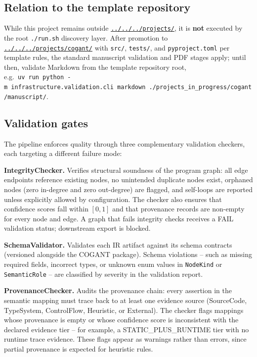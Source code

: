 \documentclass[
]{article}
\begin{document}
\subsection{Relation to the template
repository}\label{relation-to-the-template-repository}

While this project remains outside
\href{../../../projects/}{\texttt{../../../projects/}}, it is
\textbf{not} executed by the root \texttt{./run.sh} discovery layer.
After promotion to
\href{../../../projects/cogant/}{\texttt{../../../projects/cogant/}}
with \texttt{src/}, \texttt{tests/}, and \texttt{pyproject.toml} per
template rules, the standard manuscript validation and PDF stages apply;
until then, validate Markdown from the template repository root,
e.g.~\texttt{uv\ run\ python\ -m\ infrastructure.validation.cli\ markdown\ ./projects\_in\_progress/cogant/manuscript/}.

\subsection{Validation gates}\label{validation-gates}

The pipeline enforces quality through three complementary validation
checkers, each targeting a different failure mode:

\textbf{IntegrityChecker.} Verifies structural soundness of the program
graph: all edge endpoints reference existing nodes, no unintended
duplicate nodes exist, orphaned nodes (zero in-degree and zero
out-degree) are flagged, and self-loops are reported unless explicitly
allowed by configuration. The checker also ensures that confidence
scores fall within \([0, 1]\) and that provenance records are non-empty
for every node and edge. A graph that fails integrity checks receives a
FAIL validation status; downstream export is blocked.

\textbf{SchemaValidator.} Validates each IR artifact against its schema
contracts (versioned alongside the COGANT package). Schema violations --
such as missing required fields, incorrect types, or unknown enum values
in \texttt{NodeKind} or \texttt{SemanticRole} -- are classified by
severity in the validation report.

\textbf{ProvenanceChecker.} Audits the provenance chain: every assertion
in the semantic mapping must trace back to at least one evidence source
(SourceCode, TypeSystem, ControlFlow, Heuristic, or External). The
checker flags mappings whose provenance is empty or whose confidence
score is inconsistent with the declared evidence tier -- for example, a
STATIC\_PLUS\_RUNTIME tier with no runtime trace evidence. These flags
appear as warnings rather than errors, since partial provenance is
expected for heuristic rules.
\end{document}
